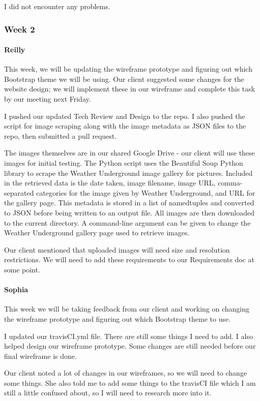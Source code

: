 \documentclass[onecolumn, draftclsnofoot,10pt, compsoc]{IEEEtran}
\begin{document}
\begin{flushleft}
 
I did not encounter any problems.
 
\subsubsection{Week 2}
\paragraph{Reilly}
 
This week, we will be updating the wireframe prototype and figuring out which Bootstrap theme we will be using. Our client suggested some changes for the website design; we will implement these in our wireframe and complete this task by our meeting next Friday.
 
 
I pushed our updated Tech Review and Design to the repo. I also pushed the script for image scraping along with the image metadata as JSON files to the repo, then submitted a pull request.
 
The images themselves are in our shared Google Drive - our client will use these images for initial testing. The Python script uses the Beautiful Soup Python library to scrape the Weather Underground image gallery for pictures. Included in the retrieved data is the date taken, image filename, image URL, comma-separated categories for the image given by Weather Underground, and URL for the gallery page. This metadata is stored in a list of namedtuples and converted to JSON before being written to an output file. All images are then downloaded to the current directory. A command-line argument can be given to change the Weather Underground gallery page used to retrieve images.
 
 
Our client mentioned that uploaded images will need size and resolution restrictions. We will need to add these requirements to our Requirements doc at some point.
 
\paragraph{Sophia}
 
This week we will be taking feedback from our client and working on changing the wireframe prototype and figuring out which Bootstrap theme to use.
 
 
I updated our travisCI.yml file. There are still some things I need to add. I also helped design our wireframe prototype. Some changes are still needed before our final wireframe is done.
 
 
Our client noted a lot of changes in our wireframes, so we will need to change some things. She also told me to add some things to the travisCI file which I am still a little confused about, so I will need to research more into it.
 

\end{flushleft}
\end{document}
